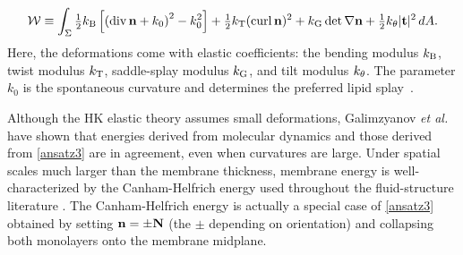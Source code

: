 \begin{equation}
\label{ansatz3}
{\cal W} \equiv \int_{\Sigma} 
  \tfrac{1}{2}k_{\mathrm{B}}\left[ \left( \operatorname{div} {\bf n} + k_0\right)^2 - k_0^2\right] 
+ \tfrac{1}{2}k_{\mathrm{T}} (\operatorname{curl} {\bf n})^2 + k_{\mathrm{G}}  \det \nabla {\bf n} + \tfrac{1}{2}k_{\theta} |{\bf t}|^2 \,dA.
\end{equation}
Here, 
the deformations come with elastic coefficients: the bending modulus
$k_{\mathrm{B}}$, twist modulus $k_{\mathrm{T}}$, saddle-splay modulus $k_{\mathrm{G}}$, and tilt modulus
$k_{\theta}$.
%
The parameter $k_0$ is the spontaneous curvature and determines the
preferred lipid splay~\cite{RoLi15,Kozlov2007}.  

Although the HK elastic theory assumes small deformations, 
Galimzyanov {\em et al.}~\cite{C9SM02079A} have shown that energies derived from
molecular dynamics and those derived from \eqref{ansatz3} are in agreement, even when curvatures are large.
Under spatial scales much larger than the membrane thickness, membrane
energy is well-characterized by the Canham-Helfrich energy used
throughout the fluid-structure literature \cite{QiangDu09,
Lowengrub07,KimLai2010_JCP, Hu, HuLaiSeolEtAl2016_JCP, qua-bir2014,
qua-vee-you2019}. The Canham-Helfrich energy is actually a special case
of \eqref{ansatz3} obtained by setting ${\bf n} =  \pm {\bf N}$ (the
$\pm$ depending on orientation) and collapsing both monolayers onto the
membrane midplane.

